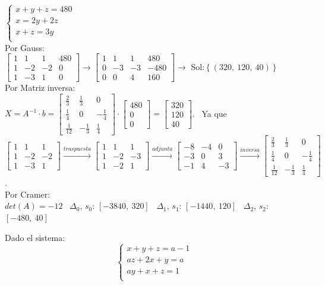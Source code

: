 \documentclass[addpoints,spanish, 12pt,a4paper]{exam}
\begin{document}
\begin{questions}
\begin{solution}
$\left\{\begin{matrix}x + y + z = 480\\x = 2 y + 2 z\\x + z = 3 y\\\end{matrix}\right.$ \\  Por Gauss: \\ $\left[\begin{matrix}1 & 1 & 1 & 480\\1 & -2 & -2 & 0\\1 & -3 & 1 & 0\end{matrix}\right]\rightarrow\left[\begin{matrix}1 & 1 & 1 & 480\\0 & -3 & -3 & -480\\0 & 0 & 4 & 160\end{matrix}\right]\to$ Sol:$\left\{\left( 320, \  120, \  40\right)\right\}$ \\ Por Matriz inversa: \\ $X=A^{-1}\cdot b=\left[\begin{matrix}\frac{2}{3} & \frac{1}{3} & 0\\\frac{1}{4} & 0 & - \frac{1}{4}\\\frac{1}{12} & - \frac{1}{3} & \frac{1}{4}\end{matrix}\right]\cdot\left[\begin{matrix}480\\0\\0\end{matrix}\right]=\left[\begin{matrix}320\\120\\40\end{matrix}\right]$. \ Ya que $\left[\begin{matrix}1 & 1 & 1\\1 & -2 & -2\\1 & -3 & 1\end{matrix}\right]\xrightarrow{traspuesta}\left[\begin{matrix}1 & 1 & 1\\1 & -2 & -3\\1 & -2 & 1\end{matrix}\right]\xrightarrow{adjunta}\left[\begin{matrix}-8 & -4 & 0\\-3 & 0 & 3\\-1 & 4 & -3\end{matrix}\right]\xrightarrow{inversa}\left[\begin{matrix}\frac{2}{3} & \frac{1}{3} & 0\\\frac{1}{4} & 0 & - \frac{1}{4}\\\frac{1}{12} & - \frac{1}{3} & \frac{1}{4}\end{matrix}\right]$. \\ Por Cramer: \\ $det(A)=-12$ \ $\Delta_0$, $s_0$: $\left[ -3840, \  320\right]$ \ $\Delta_1$, $s_1$: $\left[ -1440, \  120\right]$ \ $\Delta_2$, $s_2$: $\left[ -480, \  40\right]$ \ \end{solution}

\question Dado el sistema: $$\left\{\begin{matrix}x + y + z = a - 1\\a z + 2 x + y = a\\a y + x + z = 1\\\end{matrix}\right.$$
\begin{solution}
$\left
\end{solution}
\end{questions}
\end{document}
